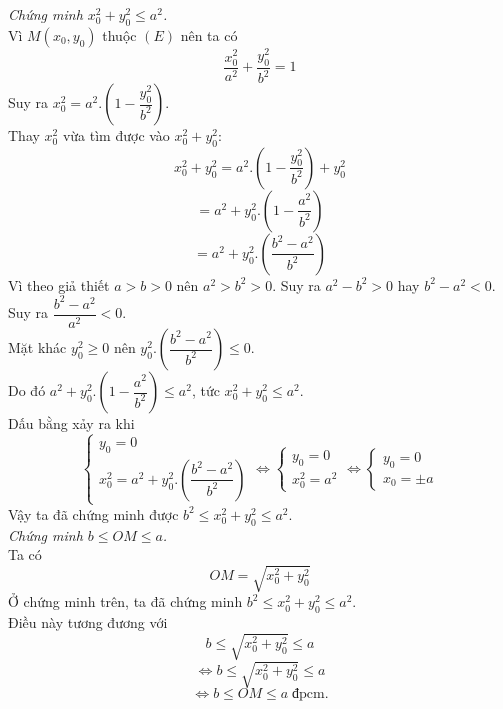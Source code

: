 \begin{bt}
{\begin{enumerate}[a)]
\textit{Chứng minh $x_0^2+y_0^2 \leq a^2$.}\\
Vì $M\left(x_{0}, y_{0}\right)$ thuộc $(E)$ nên ta có
$$\dfrac{x_0^{2}}{a^{2}}+\dfrac{y_0^{2}}{b^{2}}=1 $$
Suy ra $x_0^2=a^2.\left( 1- \dfrac{y_0^{2}}{b^{2}} \right) $.\\
Thay $x_0^2$ vừa tìm được vào $x_{0}^{2}+y_{0}^{2}$:
$$x_{0}^{2}+y_{0}^{2}=a^2.\left( 1- \dfrac{y_0^{2}}{b^{2}} \right) + y_{0}^{2} $$
$$ =a^2 +y_0^2.\left( 1 - \dfrac{a^2}{b^2}\right)  $$
$$ =a^2 +y_0^2.\left( \dfrac{b^2-a^2}{b^2}\right) $$
Vì theo giả thiết $a>b>0$ nên $a^2>b^2>0$. Suy ra $a^2-b^2 >0$ hay $b^2-a^2 <0$. \\
Suy ra $\dfrac{b^2-a^2}{a^2} <0$.\\
Mặt khác $y_0^2 \geq 0$ nên $y_0^2.\left( \dfrac{b^2-a^2}{b^2}\right) \leq 0$.\\
Do đó $a^2 +y_0^2.\left( 1 - \dfrac{a^2}{b^2}\right) \leq a^2$, tức $x_{0}^{2}+y_{0}^{2} \leq a^2.$\\
Dấu bằng xảy ra khi \[\left\{ {\begin{array}{*{20}{c}}
  {{y_0} = 0} \\ 
  {x_0^2 = a^2 +y_0^2.\left( \dfrac{b^2-a^2}{b^2}\right)} 
\end{array}} \right. \Leftrightarrow \left\{ {\begin{array}{*{20}{c}}
  {{y_0} = 0} \\ 
  {x_0^2 = {a^2}} 
\end{array}} \right. \Leftrightarrow \left\{ {\begin{array}{*{20}{c}}
  {{y_0} = 0} \\ 
  {{x_0} =  \pm a} 
\end{array}} \right.\]
Vậy ta đã chứng minh được $b^{2} \leq x_{0}^{2}+y_{0}^{2} \leq a^{2}$.\\
\textit{Chứng minh $b \leq O M \leq a$.}\\
Ta có 
\[OM=\sqrt{x_0^2+y_0^2}\]
Ở chứng minh trên, ta đã chứng minh 
$b^{2} \leq x_{0}^{2}+y_{0}^{2} \leq a^{2}$.\\
Điều này tương đương với 
\[b \leq \sqrt{x_0^2+y_0^2} \leq a\]
\[\Leftrightarrow b \leq \sqrt{x_0^2+y_0^2} \leq a\]
\[\Leftrightarrow b \leq OM \leq a \; \text{đpcm.}\]
\end{enumerate}
}
\end{bt}

